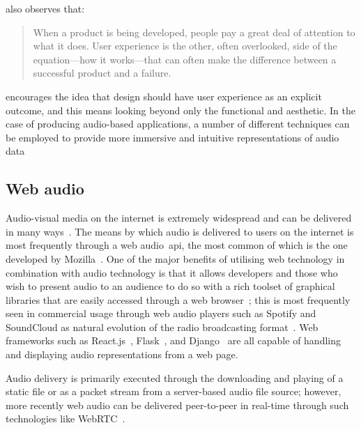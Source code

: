 \citet{garrett2010elements} also observes that:

\begin{quotation}
    When a product is being developed, people pay a great deal of attention to what it does.
    User experience is the other, often overlooked, side of the equation—how it works—that can often make the difference between a successful product and a failure.
\end{quotation}

\citet{garrett2010elements} encourages the idea that design should have user experience as an explicit outcome,
and this means looking beyond only the functional and aesthetic.
In the case of producing audio-based applications,
a number of different techniques can be employed
to provide more immersive and intuitive representations of audio data~\citep{geolocation-player, discovery-collections}


\subsection{Web audio}\label{subsec:web-audio}

Audio-visual media on the internet is extremely widespread and can be delivered in many ways~\citep{Bruegger2018}.
The means by which audio is delivered to users on the internet is most frequently through a web audio~\gls{api}, the most common of which is the one developed by Mozilla~\citep{w3c_audio_api, mdn_audio_api}.
One of the major benefits of utilising web technology in combination with audio technology is that it allows developers and those who wish to present audio to an audience to do so with a rich toolset of graphical libraries that are easily accessed through a web browser~\citep{Pauwels2018pywebaudioplayerBT};
this is most frequently seen in commercial usage through web audio players such as Spotify and SoundCloud as natural evolution of the radio broadcasting format~\citep{Bottomley2020}.
Web frameworks such as React.js~\citep{Minnick2022}, Flask~\citep{Zhai2022},
and Django~\citep{Pauwels2018pywebaudioplayerBT} are all capable of handling and displaying audio representations from a web page.

Audio delivery is primarily executed through the downloading and playing of a static file or as a packet stream from a server-based audio file source;
however, more recently web audio can be delivered peer-to-peer in real-time through such technologies like WebRTC~\citep{webrtc, Garcia2019}.
